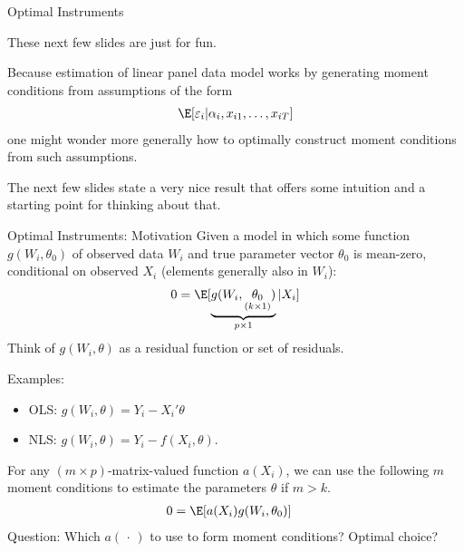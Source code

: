 \documentclass[aspectratio=169, handout]{beamer}
\begin{document}
{\footnotesize
\begin{frame}{Optimal Instruments}

These next few slides are just for fun.

Because estimation of linear panel data model works by generating moment
conditions from assumptions of the form
\begin{align*}
  \E[\varepsilon_i|\alpha_i,x_{i1},\ldots,x_{iT}]
\end{align*}
one might wonder more generally how to optimally construct moment
conditions from such assumptions.

The next few slides state a very nice result that offers some intuition
and a starting point for thinking about that.
\end{frame}
}


{\footnotesize
\begin{frame}{Optimal Instruments: Motivation}
Given a model in which some function $g(W_i,\theta_0)$ of
observed data $W_i$ and true parameter vector $\theta_0$ is mean-zero,
conditional on observed $X_i$ (elements generally also in $W_i$):
\begin{align}
  0 =
  \E[
    \underbrace{%
      g(W_i,\underset{(k\times 1)}{\theta_0})
    }_{p\times 1}
    |
    X_i
  ]
  \label{momentmodel}
\end{align}
Think of $g(W_i,\theta)$ as a \alert{residual} function or set of
residuals.

\alert{Examples}:
\begin{itemize}
  \item OLS: $g(W_i,\theta)=Y_i-X_i'\theta$
  \item NLS: $g(W_i,\theta)=Y_i-f(X_i,\theta)$.
\end{itemize}
For any $(m\times p)$-matrix-valued function $a(X_i)$,
we can use the following $m$ moment conditions to estimate the
parameters $\theta$ if $m>k$.
\begin{align}
  0 &= \E[a(X_i)g(W_i,\theta_0)]
\end{align}
\alert{Question}:
Which $a(\,\cdot\,)$ to use to form moment conditions?
Optimal choice?
\end{frame}
}
\end{document}
